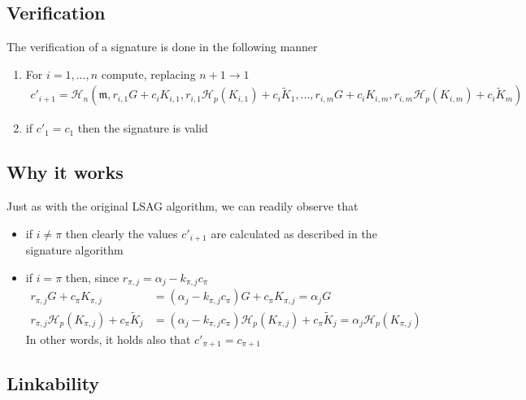 \subsection*{Verification}

The verification of a signature is done in the following manner

\begin{enumerate}
	\item  For \(i = 1, ..., n\) compute, replacing \(n + 1 \rightarrow 1\)
	\begin{align*}
	c'_{i+1} = \mathcal{H}_n(\mathfrak{m}, r_{i, 1} G + c_i K_{i, 1}, r_{i, 1} \mathcal{H}_p(K_{i, 1}) + c_i \tilde{K}_1, 
	..., r_{i, m} G + c_i K_{i, m}, r_{i, m} \mathcal{H}_p(K_{i, m}) + c_i \tilde{K}_m) 
	\end{align*}
	
	\item if \(c'_1 = c_1\) then the signature is valid
\end{enumerate}


\subsection*{Why it works}

Just as with the original LSAG algorithm, we can readily observe that

\begin{itemize}

\item[] if \(i \ne \pi \) then clearly the values \(c'_{i + 1}\) are calculated as described in the signature algorithm

\item[] if \(i = \pi\) then, since \(r_{\pi, j} = \alpha_j -k_{\pi, j} c_\pi \)
\begin{align*}  
  r_{\pi, j} G + c_\pi K_{\pi,j}                              
                   &= (\alpha_j - k_{\pi, j} c_\pi) G + c_\pi K_{\pi, j}     
                   = \alpha_j G \\  
  r_{\pi, j} \mathcal{H}_p(K_{\pi, j}) + c_\pi \tilde{K}_j  
                   &= (\alpha_j - k_{\pi, j} c_\pi) \mathcal{H}_p(K_{\pi, j}) + c_\pi \tilde{K}_j 
                   = \alpha_j \mathcal{H}_p(K_{\pi, j}) 
\end{align*}
   In other words, it holds also that \(c'_{\pi + 1} = c_{\pi+1}\) 

\end{itemize}


\subsection*{Linkability}

